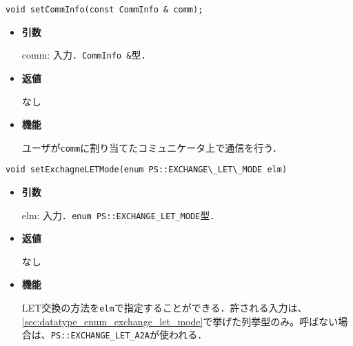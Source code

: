 
\begin{screen}
\begin{verbatim}
void setCommInfo(const CommInfo & comm);
\end{verbatim}
\end{screen}

\begin{itemize}

\item {\bf 引数}

comm: 入力．{\tt CommInfo \&}型．

\item {\bf 返値}

なし

\item {\bf 機能}

ユーザが{\tt comm}に割り当てたコミュニケータ上で通信を行う．

\end{itemize}




\begin{screen}
\begin{verbatim}
void setExchagneLETMode(enum PS::EXCHANGE\_LET\_MODE elm)
\end{verbatim}
\end{screen}

\begin{itemize}

\item {\bf 引数}

elm: 入力．{\tt enum PS::EXCHANGE\_LET\_MODE}型．

\item {\bf 返値}

なし

\item {\bf 機能}

LET交換の方法を{\tt elm}で指定することができる．許される入力は、
\ref{sec:datatype_enum_exchange_let_mode}で挙げた列挙型のみ。呼ばない場合は、{\tt PS::EXCHANGE\_LET\_A2A}が使われる．

\end{itemize}


